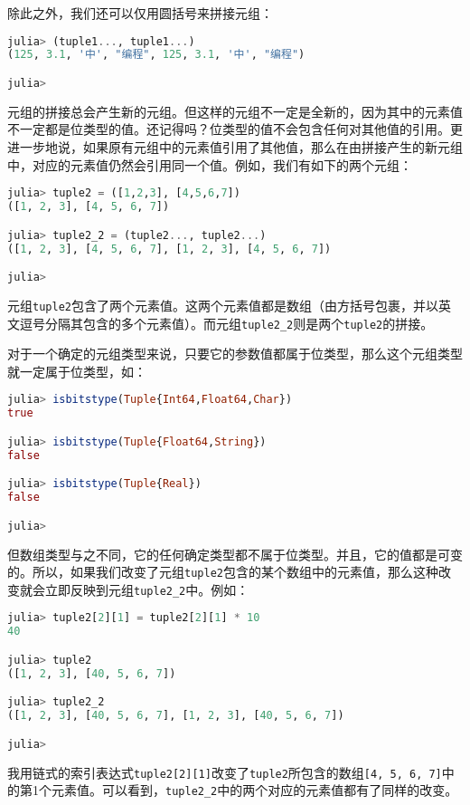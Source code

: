 除此之外，我们还可以仅用圆括号来拼接元组：
\begin{lstlisting}[language=julia]
julia> (tuple1..., tuple1...)
(125, 3.1, '中', "编程", 125, 3.1, '中', "编程")

julia> 
\end{lstlisting}

元组的拼接总会产生新的元组。但这样的元组不一定是全新的，因为其中的元素值不一定都是位类型的值。还记得吗？位类型的值不会包含任何对其他值的引用。更进一步地说，如果原有元组中的元素值引用了其他值，那么在由拼接产生的新元组中，对应的元素值仍然会引用同一个值。例如，我们有如下的两个元组：
\begin{lstlisting}[language=julia]
julia> tuple2 = ([1,2,3], [4,5,6,7])
([1, 2, 3], [4, 5, 6, 7])

julia> tuple2_2 = (tuple2..., tuple2...)
([1, 2, 3], [4, 5, 6, 7], [1, 2, 3], [4, 5, 6, 7])

julia> 
\end{lstlisting}

元组\verb|tuple2|包含了两个元素值。这两个元素值都是数组（由方括号包裹，并以英文逗号分隔其包含的多个元素值）。而元组\verb|tuple2_2|则是两个\verb|tuple2|的拼接。

对于一个确定的元组类型来说，只要它的参数值都属于位类型，那么这个元组类型就一定属于位类型，如：
\begin{lstlisting}[language=julia]
julia> isbitstype(Tuple{Int64,Float64,Char})
true

julia> isbitstype(Tuple{Float64,String})
false

julia> isbitstype(Tuple{Real})
false

julia> 
\end{lstlisting}

但数组类型与之不同，它的任何确定类型都不属于位类型。并且，它的值都是可变的。所以，如果我们改变了元组\verb|tuple2|包含的某个数组中的元素值，那么这种改变就会立即反映到元组\verb|tuple2_2|中。例如：
\begin{lstlisting}[language=julia]
julia> tuple2[2][1] = tuple2[2][1] * 10
40

julia> tuple2
([1, 2, 3], [40, 5, 6, 7])

julia> tuple2_2
([1, 2, 3], [40, 5, 6, 7], [1, 2, 3], [40, 5, 6, 7])

julia> 
\end{lstlisting}

我用链式的索引表达式\verb|tuple2[2][1]|改变了\verb|tuple2|所包含的数组\verb|[4, 5, 6, 7]|中的第1个元素值。可以看到，\verb|tuple2_2|中的两个对应的元素值都有了同样的改变。


